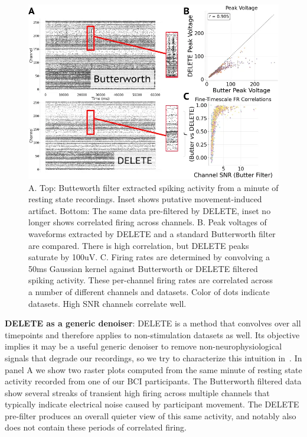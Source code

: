 \documentclass[12pt,oneside]{report}
\begin{document}
\begin{figure}[h]
  \centering
  \includegraphics[width=0.8\linewidth]{ch4_delete_generic.png}
  \caption{A. Top: Butteworth filter extracted spiking activity from a minute of resting state recordings. Inset shows putative movement-induced artifact. Bottom: The same data pre-filtered by DELETE, inset no longer shows correlated firing across channels. B. Peak voltages of waveforms extracted by DELETE and a standard Butterworth filter are compared. There is high correlation, but DELETE peaks saturate by 100uV. C. Firing rates are determined by convolving a 50ms Gaussian kernel against Butterworth or DELETE filtered spiking activity. These per-channel firing rates are correlated across a number of different channels and datasets. Color of dots indicate datasets. High SNR channels correlate well.}
  \label{fig:delete_generic}
\end{figure}

\textbf{DELETE as a generic denoiser}: DELETE is a method that convolves over all timepoints and therefore applies to non-stimulation datasets as well. Its objective implies it may be a useful generic denoiser to remove non-neurophysiological signals that degrade our recordings, so we try to characterize this intuition in~. In panel A we show two raster plots computed from the same minute of resting state activity recorded from one of our BCI participants. The Butterworth filtered data show several streaks of transient high firing across multiple channels that typically indicate electrical noise caused by participant movement. The DELETE pre-filter produces an overall quieter view of this same activity, and notably also does not contain these periods of correlated firing.
\end{document}
